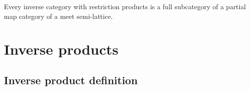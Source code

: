 \begin{corollary}
  Every inverse category with restriction products is a full subcategory of a partial map category
  of a meet semi-lattice.
\end{corollary}


\section{Inverse products} %
\label{sec:inverse_products}

\subsection{Inverse product definition} %
\label{sub:inverse_product_definition}


